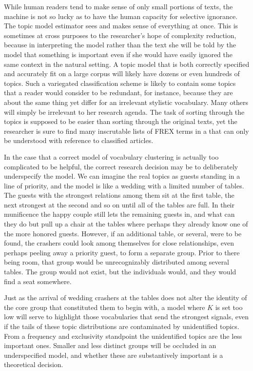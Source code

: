 \documentclass[]{book}
\theoremstyle{definition}
\theoremstyle{definition}
\theoremstyle{definition}
\theoremstyle{remark}
\begin{document}
While human readers tend to make sense of only small portions of texts,
the machine is not so lucky as to have the human capacity for selective
ignorance. The topic model estimator sees and makes sense of everything
at once. This is sometimes at cross purposes to the researcher's hope of
complexity reduction, because in interpreting the model rather than the
text she will be told by the model that something is important even if
she would have easily ignored the same context in the natural setting. A
topic model that is both correctly specified and accurately fit on a
large corpus will likely have dozens or even hundreds of topics. Such a
variegated classification scheme is likely to contain some topics that a
reader would consider to be redundant, for instance, because they are
about the same thing yet differ for an irrelevant stylistic vocabulary.
Many others will simply be irrelevant to her research agenda. The task
of sorting through the topics is supposed to be easier than sorting
through the original texts, yet the researcher is sure to find many
inscrutable lists of FREX terms in a that can only be understood with
reference to classified articles.

In the case that a correct model of vocabulary clustering is actually
too complicated to be helpful, the correct research decision may be to
deliberately underspecify the model. We can imagine the real topics as
guests standing in a line of priority, and the model is like a wedding
with a limited number of tables. The guests with the strongest relations
among them sit at the first table, the next strongest at the second and
so on until all of the tables are full. In their munificence the happy
couple still lets the remaining guests in, and what can they do but pull
up a chair at the tables where perhaps they already know one of the more
honored guests. However, if an additional table, or several, were to be
found, the crashers could look among themselves for close relationships,
even perhaps peeling away a priority guest, to form a separate group.
Prior to there being room, that group would be unrecognizably
distributed among several tables. The group would not exist, but the
individuals would, and they would find a seat somewhere.

Just as the arrival of wedding crashers at the tables does not alter the
identity of the core group that constituted them to begin with, a model
where \(K\) is set too low will serve to highlight those vocabularies
that send the strongest signals, even if the tails of these topic
distributions are contaminated by unidentified topics. From a frequency
and exclusivity standpoint the unidentified topics are the less
important ones. Smaller and less distinct groups will be occluded in an
underspecified model, and whether these are substantively important is a
theoretical decision.
\end{document}
